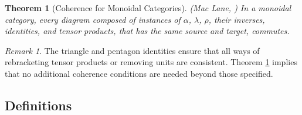 \documentclass{article}
\theoremstyle{plain}
\newtheorem{theorem}{Theorem}[section]
\theoremstyle{remark}
\newtheorem*{remark}{Remark}
\begin{document}
\begin{theorem}[Coherence for Monoidal Categories]
\label{thm:monoidal-coherence}
(Mac Lane, \cite{MacLane63}) In a monoidal category, every diagram composed of instances of $\alpha$, $\lambda$, $\rho$, their inverses, identities, and tensor products, that has the same source and target, commutes.
\end{theorem}

\begin{remark}
The triangle and pentagon identities ensure that all ways of rebracketing tensor products or removing units are consistent. Theorem \ref{thm:monoidal-coherence} implies that no additional coherence conditions are needed beyond those specified.
\end{remark}

\newpage
\subsection{Definitions}
\end{document}
